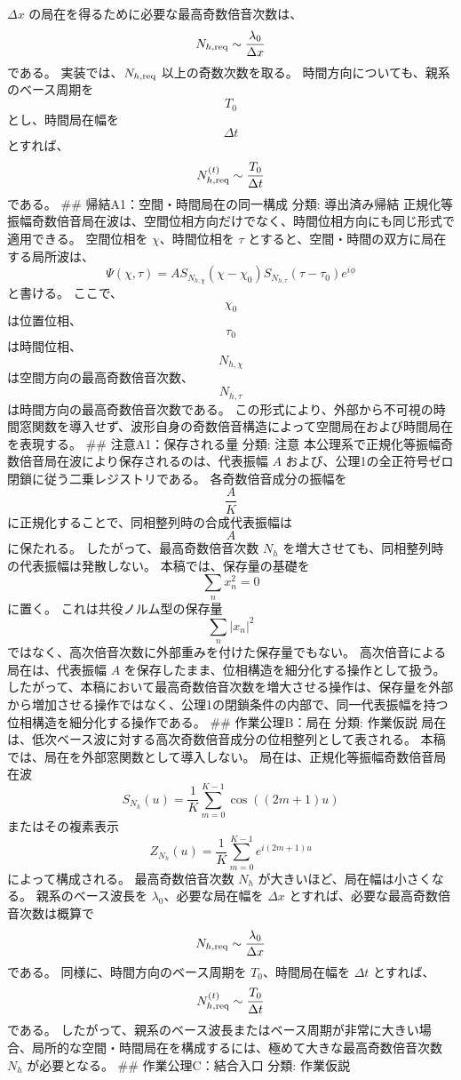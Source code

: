 \documentclass[
  a4paper,
]{ltjsarticle}
\begin{document}
\(\Delta x\) の局在を得るために必要な最高奇数倍音次数は、 \[
N_{h,\rm req}\sim\frac{\lambda_0}{\Delta x}
\] である。 実装では、\(N_{h,\rm req}\) 以上の奇数次数を取る。
時間方向についても、親系のベース周期を \[
T_0
\] とし、時間局在幅を \[
\Delta t
\] とすれば、 \[
N_{h,\rm req}^{(t)}\sim\frac{T_0}{\Delta t}
\] である。 \#\# 帰結A1：空間・時間局在の同一構成 分類: 導出済み帰結
正規化等振幅奇数倍音局在波は、空間位相方向だけでなく、時間位相方向にも同じ形式で適用できる。
空間位相を \(\chi\)、時間位相を \(\tau\)
とすると、空間・時間の双方に局在する局所波は、 \[
\Psi(\chi,\tau)=A S_{N_{h,\chi}}(\chi-\chi_0)S_{N_{h,\tau}}(\tau-\tau_0)e^{i\phi}
\] と書ける。 ここで、 \[
\chi_0
\] は位置位相、 \[
\tau_0
\] は時間位相、 \[
N_{h,\chi}
\] は空間方向の最高奇数倍音次数、 \[
N_{h,\tau}
\] は時間方向の最高奇数倍音次数である。
この形式により、外部から不可視の時間窓関数を導入せず、波形自身の奇数倍音構造によって空間局在および時間局在を表現する。
\#\# 注意A1：保存される量 分類: 注意
本公理系で正規化等振幅奇数倍音局在波により保存されるのは、代表振幅 \(A\)
および、公理1の全正符号ゼロ閉鎖に従う二乗レジストリである。
各奇数倍音成分の振幅を \[
\frac{A}{K}
\] に正規化することで、同相整列時の合成代表振幅は \[
A
\] に保たれる。 したがって、最高奇数倍音次数 \(N_h\)
を増大させても、同相整列時の代表振幅は発散しない。
本稿では、保存量の基礎を \[
\sum_n x_n^2=0
\] に置く。 これは共役ノルム型の保存量 \[
\sum_n |x_n|^2
\] ではなく、高次倍音次数に外部重みを付けた保存量でもない。
高次倍音による局在は、代表振幅 \(A\)
を保存したまま、位相構造を細分化する操作として扱う。
したがって、本稿において最高奇数倍音次数を増大させる操作は、保存量を外部から増加させる操作ではなく、公理1の閉鎖条件の内部で、同一代表振幅を持つ位相構造を細分化する操作である。
\#\# 作業公理B：局在 分類: 作業仮説
局在は、低次ベース波に対する高次奇数倍音成分の位相整列として表される。
本稿では、局在を外部窓関数として導入しない。
局在は、正規化等振幅奇数倍音局在波 \[
S_{N_h}(u)=\frac{1}{K}\sum_{m=0}^{K-1}\cos((2m+1)u)
\] またはその複素表示 \[
Z_{N_h}(u)=\frac{1}{K}\sum_{m=0}^{K-1}e^{i(2m+1)u}
\] によって構成される。 最高奇数倍音次数 \(N_h\)
が大きいほど、局在幅は小さくなる。 親系のベース波長を
\(\lambda_0\)、必要な局在幅を \(\Delta x\)
とすれば、必要な最高奇数倍音次数は概算で \[
N_{h,\rm req}\sim\frac{\lambda_0}{\Delta x}
\] である。 同様に、時間方向のベース周期を \(T_0\)、時間局在幅を
\(\Delta t\) とすれば、 \[
N_{h,\rm req}^{(t)}\sim\frac{T_0}{\Delta t}
\] である。
したがって、親系のベース波長またはベース周期が非常に大きい場合、局所的な空間・時間局在を構成するには、極めて大きな最高奇数倍音次数
\(N_h\) が必要となる。 \#\# 作業公理C：結合入口 分類: 作業仮説
\end{document}
